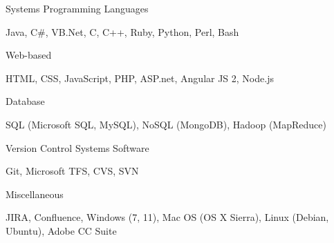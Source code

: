 \begin{cventries}
  \cventry
    {Systems}
    {Programming Languages}
    { }
    { }
    {
      \begin{cvitems}
        \item {Java, C\#, VB.Net, C, C++, Ruby, Python, Perl, Bash}
      \end{cvitems}
    }
  \cventry
    {Web-based}
    { }
    { }
    { }
    {
      \begin{cvitems}
        \item {HTML, CSS, JavaScript, PHP, ASP.net, Angular JS 2, Node.js}
      \end{cvitems}
    }
  \cventry
    {Database}
    { }
    { }
    { }
    {
      \begin{cvitems}
        \item {SQL (Microsoft SQL, MySQL), NoSQL (MongoDB), Hadoop (MapReduce)}
      \end{cvitems}
    }
  \cventry
    {Version Control Systems}
    {Software}
    { }
    { }
    {
      \begin{cvitems}
        \item {Git, Microsoft TFS, CVS, SVN}
      \end{cvitems}
    }
  \cventry
    {Miscellaneous}
    { }
    { }
    { }
    {
      \begin{cvitems}
        \item {JIRA, Confluence, Windows (7, 11), Mac OS (OS X Sierra), Linux (Debian, Ubuntu), Adobe CC Suite}
      \end{cvitems}
    }
\end{cventries}
